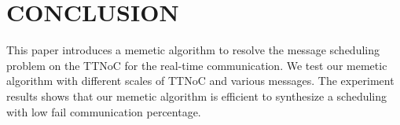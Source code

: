 \documentclass[journal]{IEEEtran}
\begin{document}
\section{CONCLUSION\label{s:conclud}}

This paper introduces a memetic algorithm to resolve the message scheduling problem on the TTNoC for the real-time communication. We test our memetic algorithm with different scales of TTNoC and various messages. The experiment results shows that our memetic algorithm is efficient to synthesize a scheduling with low fail communication percentage.















%
%
%




\balance



\end{document}

